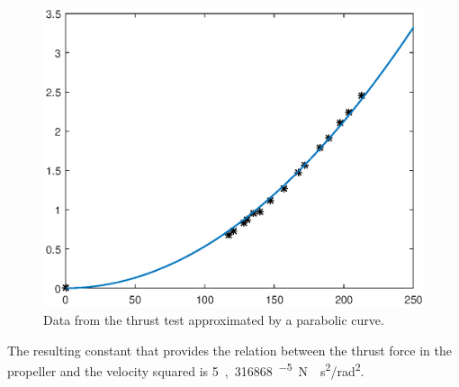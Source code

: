 \begin{figure}[H]
	\centering
	\includegraphics[scale=0.8]{figures/ThrustGraph.eps}
	\caption{Data from the thrust test approximated by a parabolic curve.}
	\label{ThrustGraph}
\end{figure}

The resulting constant that provides the relation between the thrust force in the propeller and the velocity squared is \si{5,316868^{-5} N\cdot s^2/rad^2}.
